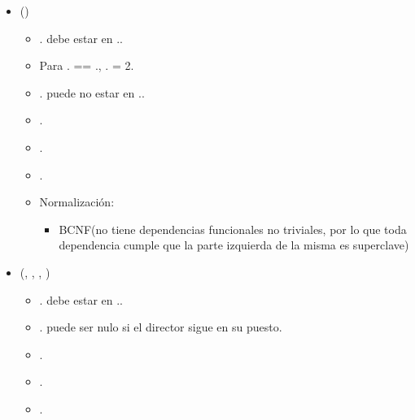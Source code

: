 \begin{itemize}
        \item {}()
            \begin{itemize}
                \item {}. debe estar en
                    ..
                \item Para . == 
                    ., .
                    = 2.
                \item {}. puede no estar en 
                    ..
                \item {}.
                \item {}.
                \item \FK{$\emptyset$}.
                \item Normalización:
                    \begin{itemize}
                        \item BCNF(no tiene dependencias funcionales no 
                            triviales, por lo que toda dependencia cumple que la
                            parte izquierda de la misma es superclave)
                    \end{itemize}
            \end{itemize}

        \item {}(, , ,
                              )
            \begin{itemize}
                \item {}. debe estar en 
                    ..
                \item {}. puede ser nulo si el director
                    sigue en su puesto.
                \item {}.
                \item {}.
                \item {}.
            \end{itemize}


\end{itemize}
